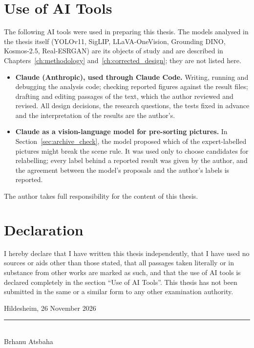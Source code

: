\documentclass[12pt,a4paper]{report}
\begin{document}


\cleardoublepage
{}
\renewcommand{\bibname}{References}
\begin{singlespace}\small


\end{singlespace}

\cleardoublepage
\chapter*{Use of AI Tools}
The following AI tools were used in preparing this thesis. The models analysed in the thesis itself (YOLOv11, SigLIP, LLaVA-OneVision, Grounding DINO, Kosmos-2.5, Real-ESRGAN) are its objects of study and are described in Chapters~\ref{ch:methodology} and~\ref{ch:corrected_design}; they are not listed here.
\begin{itemize}
    \item \textbf{Claude (Anthropic), used through Claude Code.} Writing, running and debugging the analysis code; checking reported figures against the result files; drafting and editing passages of the text, which the author reviewed and revised. All design decisions, the research questions, the tests fixed in advance and the interpretation of the results are the author's.
    \item \textbf{Claude as a vision-language model for pre-sorting pictures.} In Section~\ref{sec:archive_check}, the model proposed which of the expert-labelled pictures might break the scene rule. It was used only to choose candidates for relabelling; every label behind a reported result was given by the author, and the agreement between the model's proposals and the author's labels is reported.
\end{itemize}
The author takes full responsibility for the content of this thesis.

\cleardoublepage
\chapter*{Declaration}
I hereby declare that I have written this thesis independently, that I have used no sources or aids other than those stated, that all passages taken literally or in substance from other works are marked as such, and that the use of AI tools is declared completely in the section ``Use of AI Tools''. This thesis has not been submitted in the same or a similar form to any other examination authority.

\vspace{2cm}
\noindent Hildesheim, 26 November 2026 \hfill \rule{6cm}{0.4pt}\\
 \hfill {\small Brhanu Atsbaha}\hspace*{1.5cm}
\end{document}
